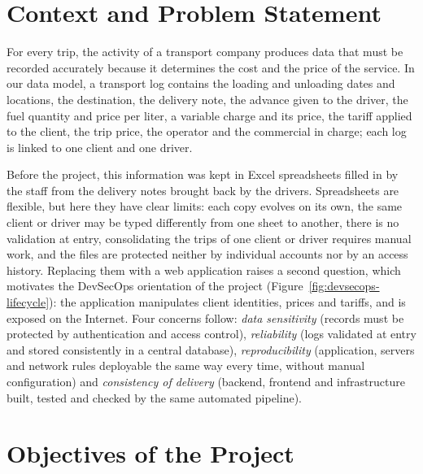 

\section{Context and Problem Statement}

For every trip, the activity of a transport company produces data that must be recorded accurately because it determines the cost and the price of the service. In our data model, a transport log contains the loading and unloading dates and locations, the destination, the delivery note, the advance given to the driver, the fuel quantity and price per liter, a variable charge and its price, the tariff applied to the client, the trip price, the operator and the commercial in charge; each log is linked to one client and one driver.

Before the project, this information was kept in Excel spreadsheets filled in by the staff from the delivery notes brought back by the drivers. Spreadsheets are flexible, but here they have clear limits: each copy evolves on its own, the same client or driver may be typed differently from one sheet to another, there is no validation at entry, consolidating the trips of one client or driver requires manual work, and the files are protected neither by individual accounts nor by an access history. Replacing them with a web application raises a second question, which motivates the DevSecOps orientation of the project (Figure~\ref{fig:devsecops-lifecycle}): the application manipulates client identities, prices and tariffs, and is exposed on the Internet. Four concerns follow: \emph{data sensitivity} (records must be protected by authentication and access control), \emph{reliability} (logs validated at entry and stored consistently in a central database), \emph{reproducibility} (application, servers and network rules deployable the same way every time, without manual configuration) and \emph{consistency of delivery} (backend, frontend and infrastructure built, tested and checked by the same automated pipeline).



\section{Objectives of the Project}

